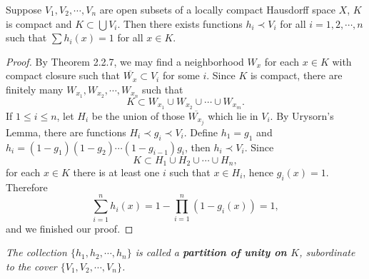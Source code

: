 \begin{theorem}
Suppose $V_1,V_2,\cdots,V_n$ are open subsets of a locally compact Hausdorff space $X$, $K$ is compact and $K\subset\bigcup V_i$. Then there exists functions $h_i\prec V_i$ for all $i=1,2,\cdots,n$ such that $\sum h_i(x)=1$ for all $x\in K$.
\end{theorem}
\begin{proof}
By Theorem 2.2.7, we may find a neighborhood $W_{x}$ for each $x\in K$ with compact closure such that $\overline{W_x}\subset V_i$ for some $i$. Since $K$ is compact, there are finitely many $W_{x_1},W_{x_2},\cdots,W_{x_n}$ such that 
$$
K\subset W_{x_1}\cup W_{x_2}\cup \cdots \cup W_{x_m}.
$$
If $1\le i\le n$, let $H_i$ be the union of those $\overline{W_{x_j}}$ which lie in $V_i$. By Urysorn's Lemma, there are functions $H_i\prec g_i\prec V_i$. Define $h_1=g_1$ and $h_i=(1-g_1)(1-g_2)\cdots(1-g_{i-1})g_i$, then $h_i\prec V_i$. Since 
$$
K\subset H_1\cup H_2\cup \cdots \cup H_n,
$$
for each $x\in K$ there is at least one $i$ such that $x\in H_i$, hence $g_i(x)=1$. Therefore 
$$\sum_{i=1}^nh_i(x)=1-\prod_{i=1}^n(1-g_i(x))=1,$$
and we finished our proof.
\end{proof}
\begin{note}\em
The collection $\{h_1,h_2,\cdots,h_n\}$ is called a \textbf{partition of unity on $K$}, subordinate to the cover $\{V_1,V_2,\cdots,V_n\}$.
\end{note}
